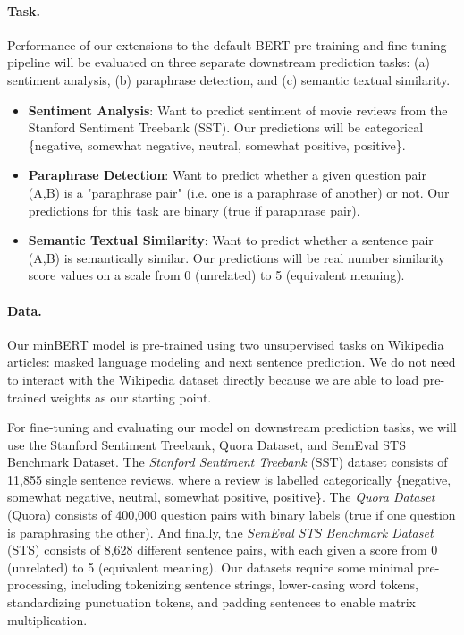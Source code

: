 \documentclass{article}
\begin{document}
\paragraph{Task.} 
Performance of our extensions to the default BERT pre-training and fine-tuning pipeline will be evaluated on three separate downstream prediction tasks: (a) sentiment analysis, (b) paraphrase detection, and (c) semantic textual similarity.

\begin{itemize}
    \item \textbf{Sentiment Analysis}: Want to predict sentiment of movie reviews from the Stanford Sentiment Treebank (SST). Our predictions will be categorical \{negative, somewhat negative, neutral, somewhat positive, positive\}.
    
    \item \textbf{Paraphrase Detection}: Want to predict whether a given question pair (A,B) is a "paraphrase pair" (i.e. one is a paraphrase of another) or not. Our predictions for this task are binary (true if paraphrase pair).
    
    \item \textbf{Semantic Textual Similarity}: Want to predict whether a sentence pair (A,B) is semantically similar. Our predictions will be real number similarity score values on a scale from 0 (unrelated) to 5 (equivalent meaning).
\end{itemize}


\paragraph{Data.}
Our minBERT model is pre-trained using two unsupervised tasks on Wikipedia articles: masked language modeling and next sentence prediction. We do not need to interact with the Wikipedia dataset directly because we are able to load pre-trained weights as our starting point.

For fine-tuning and evaluating our model on downstream prediction tasks, we will use the Stanford Sentiment Treebank, Quora Dataset, and SemEval STS Benchmark Dataset. The \emph{Stanford Sentiment Treebank} (SST) dataset consists of 11,855 single sentence reviews, where a review is labelled categorically \{negative, somewhat negative, neutral, somewhat positive, positive\}. The \emph{Quora Dataset} (Quora) consists of 400,000 question pairs with binary labels (true if one question is paraphrasing the other). And finally, the \emph{SemEval STS Benchmark Dataset} (STS) consists of 8,628 different sentence pairs, with each given a score from 0 (unrelated) to 5 (equivalent meaning). Our datasets require some minimal pre-processing, including tokenizing sentence strings, lower-casing word tokens, standardizing punctuation tokens, and padding sentences to enable matrix multiplication.
\end{document}
